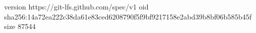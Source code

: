 version https://git-lfs.github.com/spec/v1
oid sha256:14a72ea222c38da61e83ced6208790f5f9bf9217158e2abd39b8bf06b585b45f
size 87544
